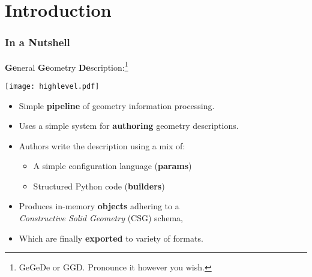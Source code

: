\documentclass[10pt,xcolor=dvipsnames]{beamer}
\begin{document}



\section{Introduction}

\begin{frame}
  \frametitle{In a Nutshell}

  \textbf{Ge}neral \textbf{Ge}ometry \textbf{De}scription:\footnote{GeGeDe or GGD.  Pronounce it however you wish.}
  \vspace{-5mm}
  \begin{center}
    \texttt{[image: highlevel.pdf]}
  \end{center}
  \vspace{-5mm}
  \begin{itemize}
  \item Simple \textbf{pipeline} of geometry information processing.
  \item Uses a simple system for \textbf{authoring} geometry descriptions.
  \item Authors write the description using a mix of:
    \begin{itemize}
    \item A simple configuration language (\textbf{params})
    \item Structured Python code (\textbf{builders})
    \end{itemize}
  \item Produces in-memory \textbf{objects} adhering to a \\ \textit{Constructive Solid
    Geometry} (CSG) schema,
  \item Which are finally \textbf{exported} to variety of formats.
  \end{itemize}

\end{frame}
\end{document}
